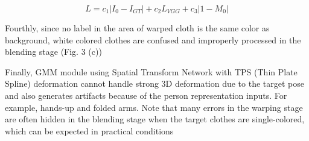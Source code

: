 \documentclass[runningheads]{llncs}
\begin{document}
\begin{equation}
L = c_1 | I_0-I_{GT} |+  c_2 L_{VGG}+c_3 |1-M_0 |        
\end{equation} 

Fourthly, since no label in the area of warped cloth is the same color as background, white colored clothes are confused and improperly processed in the blending stage (Fig. 3 (c))


Finally, GMM module using Spatial Transform Network\cite{JaderbergSZK15} with TPS (Thin Plate Spline)\cite{Bookstein1989PrincipalWT} deformation cannot handle strong 3D deformation due to the target pose and also generates artifacts because of the person representation inputs. For example, hands-up and folded arms.  Note that many errors in the warping stage are often hidden in the blending stage when the target clothes are single-colored, which can be expected in practical conditions 



\end{document}
